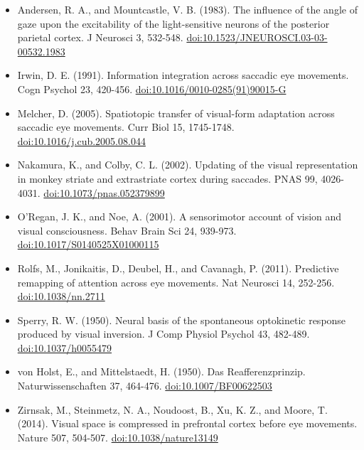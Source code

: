 \documentclass[11pt,a4paper]{article}
\begin{document}
\begin{itemize}[itemsep=2pt,topsep=2pt]
\item Andersen, R. A., and Mountcastle, V. B. (1983). The influence of the angle of gaze upon the excitability of the light-sensitive neurons of the posterior parietal cortex. J Neurosci 3, 532-548. \href{https://doi.org/10.1523/JNEUROSCI.03-03-00532.1983}{doi:10.1523/JNEUROSCI.03-03-00532.1983}
\item Irwin, D. E. (1991). Information integration across saccadic eye movements. Cogn Psychol 23, 420-456. \href{https://doi.org/10.1016/0010-0285(91)90015-G}{doi:10.1016/0010-0285(91)90015-G}
\item Melcher, D. (2005). Spatiotopic transfer of visual-form adaptation across saccadic eye movements. Curr Biol 15, 1745-1748. \href{https://doi.org/10.1016/j.cub.2005.08.044}{doi:10.1016/j.cub.2005.08.044}
\item Nakamura, K., and Colby, C. L. (2002). Updating of the visual representation in monkey striate and extrastriate cortex during saccades. PNAS 99, 4026-4031. \href{https://doi.org/10.1073/pnas.052379899}{doi:10.1073/pnas.052379899}
\item O'Regan, J. K., and Noe, A. (2001). A sensorimotor account of vision and visual consciousness. Behav Brain Sci 24, 939-973. \href{https://doi.org/10.1017/S0140525X01000115}{doi:10.1017/S0140525X01000115}
\item Rolfs, M., Jonikaitis, D., Deubel, H., and Cavanagh, P. (2011). Predictive remapping of attention across eye movements. Nat Neurosci 14, 252-256. \href{https://doi.org/10.1038/nn.2711}{doi:10.1038/nn.2711}
\item Sperry, R. W. (1950). Neural basis of the spontaneous optokinetic response produced by visual inversion. J Comp Physiol Psychol 43, 482-489. \href{https://doi.org/10.1037/h0055479}{doi:10.1037/h0055479}
\item von Holst, E., and Mittelstaedt, H. (1950). Das Reafferenzprinzip. Naturwissenschaften 37, 464-476. \href{https://doi.org/10.1007/BF00622503}{doi:10.1007/BF00622503}
\item Zirnsak, M., Steinmetz, N. A., Noudoost, B., Xu, K. Z., and Moore, T. (2014). Visual space is compressed in prefrontal cortex before eye movements. Nature 507, 504-507. \href{https://doi.org/10.1038/nature13149}{doi:10.1038/nature13149}
\end{itemize}
\end{document}
